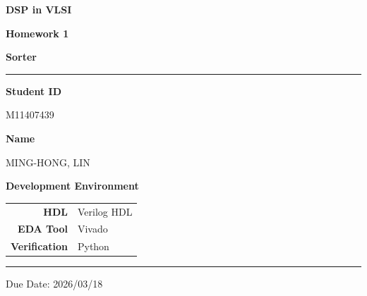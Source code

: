 \documentclass[12pt,a4paper]{report}
\begin{document}
\pagestyle{plain}

\begin{titlepage}
\centering
\vspace*{3cm}

{\fontsize{28}{34}\selectfont\bfseries DSP in VLSI\par}
\vspace{0.6em}
{\fontsize{20}{26}\selectfont\bfseries Homework 1\par}
\vspace{0.4em}
{\fontsize{16}{22}\selectfont\bfseries Sorter\par}

\vspace{1.5cm}
\textcolor{crimson}{\rule{0.6\linewidth}{1.2pt}}
\vspace{1.5cm}

{\large\bfseries Student ID}\par
\vspace{0.4em}
{\large M11407439}\par

\vspace{0.8em}

{\large\bfseries Name}\par
\vspace{0.4em}
{\large MING-HONG, LIN}\par

\vspace{2cm}

{\large\bfseries Development Environment}\par
\vspace{0.8em}
\begin{tabular}{rl}
    \textbf{HDL}      & Verilog HDL \\[4pt]
    \textbf{EDA Tool} & Vivado \\[4pt]
    \textbf{Verification} & Python \\
\end{tabular}

\vfill

\textcolor{crimson}{\rule{0.6\linewidth}{0.6pt}}\par
\vspace{0.5em}
{\small Due Date: 2026/03/18}

\end{titlepage}

\tableofcontents
\newpage
\end{document}
